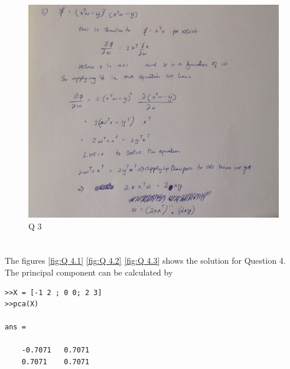 \documentclass[10pt, letterpaper]{article}
\begin{document}
\begin{figure}[h!]
	\includegraphics[width=\linewidth]{3.jpg}
	\caption{Q 3}
	\label{fig:Q 3}
\end{figure}

\newpage


\section{}
The figures \ref{fig:Q 4.1} \ref{fig:Q 4.2} \ref{fig:Q 4.3} shows the solution for Question 4.
The principal component can be calculated by 
\begin{verbatim}
>>X = [-1 2 ; 0 0; 2 3]
>>pca(X)

ans =

    -0.7071   0.7071
    0.7071    0.7071
\end{verbatim}
\end{document}
